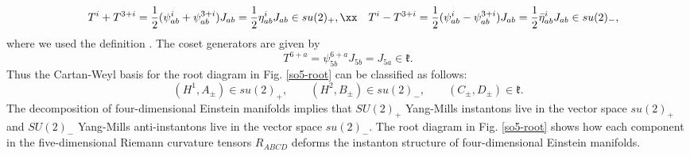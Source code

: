 \documentclass[12pt,epsf]{article}
\begin{document}
\begin{eqnarray} \label{su2-t+-}
  && T^i + T^{3+i} = \frac{1}{2} (\psi^i_{ab} + \psi^{3+i}_{ab})J_{ab} = \frac{1}{2} \eta^i_{ab} J_{ab} \in su(2)_+, \xx
  && T^i - T^{3+i} = \frac{1}{2} (\psi^i_{ab} - \psi^{3+i}_{ab})J_{ab} = \frac{1}{2} \bar{\eta}^i_{ab} J_{ab} \in su(2)_-,
\end{eqnarray}
where we used the definition . The coset generators are given by
\begin{equation}\label{coset-gen}
  T^{6+a} = \psi^{6+a}_{5b} J_{5b} = J_{5a} \in \mathfrak{k}.
\end{equation}
Thus the Cartan-Weyl basis for the root diagram in Fig. \ref{so5-root} can be classified as follows:
\begin{equation}\label{class}
  (H^1, A_\pm) \in su(2)_+, \qquad    (H^2, B_\pm) \in su(2)_-, \qquad (C_\pm, D_\pm) \in \mathfrak{k}.
\end{equation}
The decomposition of four-dimensional Einstein manifolds implies that $SU(2)_+$ Yang-Mills instantons live
in the vector space $su(2)_+$
and $SU(2)_-$ Yang-Mills anti-instantons live in the vector space $su(2)_-$.
The root diagram in Fig. \ref{so5-root} shows how each component in the five-dimensional Riemann curvature
tensors $R_{ABCD}$ deforms the instanton structure of four-dimensional Einstein manifolds.
\end{document}
